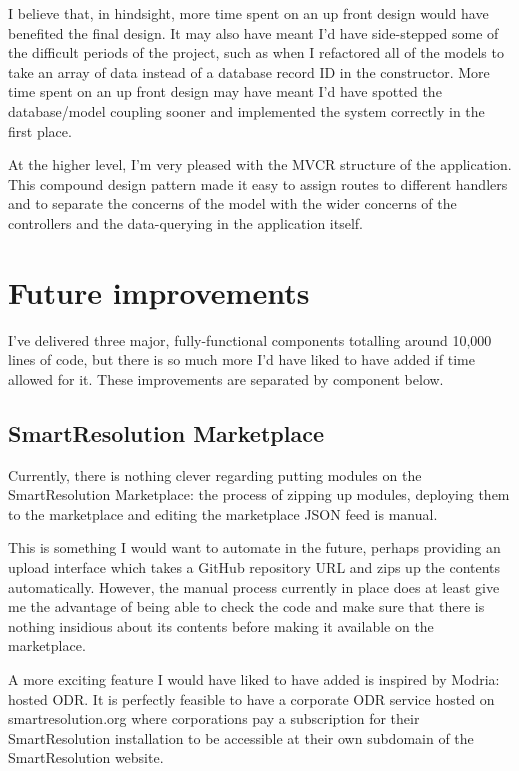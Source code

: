 I believe that, in hindsight, more time spent on an up front design would have benefited the final design. It may also have meant I'd have side-stepped some of the difficult periods of the project, such as when I refactored all of the models to take an array of data instead of a database record ID in the constructor. More time spent on an up front design may have meant I'd have spotted the database/model coupling sooner and implemented the system correctly in the first place.

At the higher level, I'm very pleased with the MVCR structure of the application. This compound design pattern made it easy to assign routes to different handlers and to separate the concerns of the model with the wider concerns of the controllers and the data-querying in the application itself.

\section{Future improvements}

I've delivered three major, fully-functional components totalling around 10,000 lines of code, but there is so much more I'd have liked to have added if time allowed for it. These improvements are separated by component below.

\subsection{SmartResolution Marketplace}

Currently, there is nothing clever regarding putting modules on the SmartResolution Marketplace: the process of zipping up modules, deploying them to the marketplace and editing the marketplace JSON feed is manual.

This is something I would want to automate in the future, perhaps providing an upload interface which takes a GitHub repository URL and zips up the contents automatically. However, the manual process currently in place does at least give me the advantage of being able to check the code and make sure that there is nothing insidious about its contents before making it available on the marketplace.

A more exciting feature I would have liked to have added is inspired by Modria: hosted ODR. It is perfectly feasible to have a corporate ODR service hosted on smartresolution.org where corporations pay a subscription for their SmartResolution installation to be accessible at their own subdomain of the SmartResolution website.

